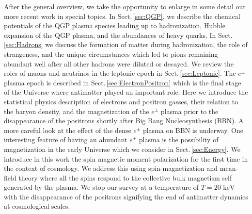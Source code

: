 \documentclass[universe,article,submit,moreauthors,pdftex,a4paper]{Definitions/mdpi}
\newcommand{\keV}{\text{ keV}}
\newcommand*{\rsec}[1]{Sect.\,{\ref{#1}}}
\newcommand*{\xblue}{\color{black}}
\begin{document}
After the general overview, we take the opportunity to enlarge in some detail our more recent work in special topics. In \rsec{sec:QGP}, we describe the chemical potentials of the QGP plasma species leading up to hadronization, Hubble expansion of the QGP plasma, and the abundances of heavy quarks. In \rsec{sec:Hadrons} we discuss the formation of matter during hadronization, the role of strangeness, and the unique circumstances which led to pions remaining abundant well after all other hadrons were diluted or decayed. We review the roles of muons and neutrinos in the leptonic epoch in \rsec{sec:Leptonic}. The $e^{\pm}$ plasma epoch is described in \rsec{sec:ElectronPositron} which is the final stage of the Universe where antimatter played an important role. Here we introduce the statistical physics description of electrons and positron gasses, their relation to the baryon density, and the magnetization of the $e^{\pm}$ plasma prior to the disappearance of the positrons shortly after Big Bang Nucleosynthesis (BBN). A more careful look at the effect of the dense $e^{\pm}$ plasma on BBN is underway. One interesting feature of having an abundant $e^{\pm}$ plasma is the possibility of magnetization in the early Universe {\xblue which we consider in \rsec{sec:Energy}. We introduce in this work the spin magnetic moment polarization for the first time in the context of cosmology.} We address this using spin-magnetization and mean-field theory where all the spins respond to the collective bulk magnetism self generated by the plasma. We stop our survey at a temperature of $T=20\keV$ with the disappearance of the positrons signifying the end of antimatter dynamics at cosmological scales.
\end{document}
